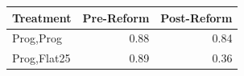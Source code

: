 \begin{tabular}{lrr}
\toprule
Treatment & Pre-Reform & Post-Reform \\
\midrule
Prog,Prog & 0.88 & 0.84 \\
Prog,Flat25 & 0.89 & 0.36 \\
\bottomrule
\end{tabular}
